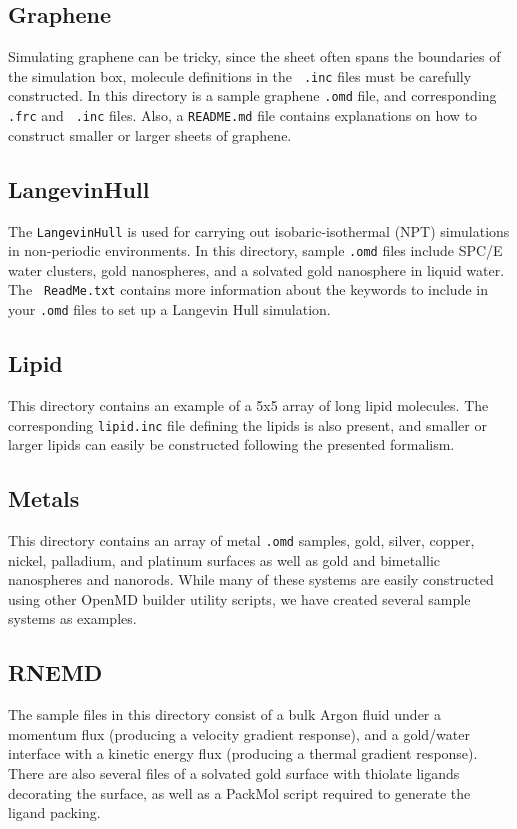 \documentclass[]{book}
\begin{document}
\subsection{Graphene}
Simulating graphene can be tricky, since the sheet often spans the
boundaries of the simulation box, molecule definitions in the {\tt
  .inc} files must be carefully constructed. In this directory is a
sample graphene {\tt .omd} file, and corresponding {\tt .frc} and {\tt
  .inc} files. Also, a {\tt README.md} file contains explanations on
how to construct smaller or larger sheets of graphene.

\subsection{LangevinHull}
The {\tt LangevinHull} is used for carrying out isobaric-isothermal
(NPT) simulations in non-periodic environments. In this directory,
sample {\tt .omd} files include SPC/E water clusters, gold
nanospheres, and a solvated gold nanosphere in liquid water. The {\tt
  ReadMe.txt} contains more information about the keywords to include
in your {\tt .omd} files to set up a Langevin Hull simulation.

\subsection{Lipid}
This directory contains an example of a 5x5 array of long lipid
molecules. The corresponding {\tt lipid.inc} file defining the lipids
is also present, and smaller or larger lipids can easily be
constructed following the presented formalism. 

\subsection{Metals}
This directory contains an array of metal {\tt .omd} samples, gold,
silver, copper, nickel, palladium, and platinum surfaces as well as
gold and bimetallic nanospheres and nanorods. While many of these
systems are easily constructed using other {\sc OpenMD} builder
utility scripts, we have created several sample systems as examples.

\subsection{RNEMD}
The sample files in this directory consist of a bulk Argon fluid under
a momentum flux (producing a velocity gradient response), and a
gold/water interface with a kinetic energy flux (producing a thermal
gradient response). There are also several files of a solvated gold
surface with thiolate ligands decorating the surface, as well as a
PackMol script required to generate the ligand packing.
\end{document}
